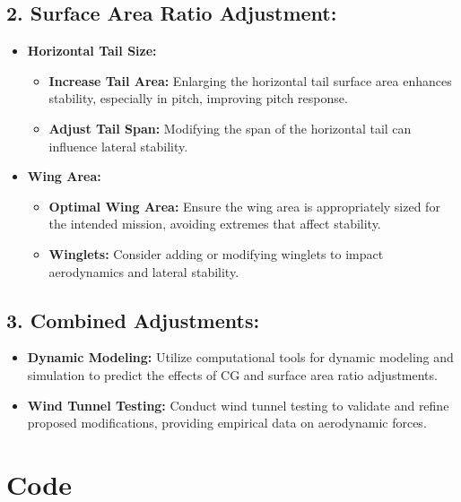 \documentclass[a4paper, twoside]{article}
\begin{document}
\subsection*{2. Surface Area Ratio Adjustment:}
\begin{itemize}
    \item \textbf{Horizontal Tail Size:}
    \begin{itemize}
        \item \textbf{Increase Tail Area:} Enlarging the horizontal tail surface area enhances stability, especially in pitch, improving pitch response.
        \item \textbf{Adjust Tail Span:} Modifying the span of the horizontal tail can influence lateral stability.
    \end{itemize}
    \item \textbf{Wing Area:}
    \begin{itemize}
        \item \textbf{Optimal Wing Area:} Ensure the wing area is appropriately sized for the intended mission, avoiding extremes that affect stability.
        \item \textbf{Winglets:} Consider adding or modifying winglets to impact aerodynamics and lateral stability.
    \end{itemize}
\end{itemize}

\subsection*{3. Combined Adjustments:}
\begin{itemize}
    \item \textbf{Dynamic Modeling:} Utilize computational tools for dynamic modeling and simulation to predict the effects of CG and surface area ratio adjustments.
    \item \textbf{Wind Tunnel Testing:} Conduct wind tunnel testing to validate and refine proposed modifications, providing empirical data on aerodynamic forces.
\end{itemize}
\section{Code}

\end{document}
